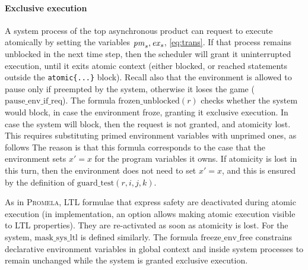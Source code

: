 \documentclass[copyright]{eptcs}
\begin{document}
\paragraph{Exclusive execution}

A system process of the top asynchronous product can request to execute atomically by setting the variables $\mathit{pm}_s, \mathit{ex}_s$, \cref{eq:trans}.
If that process remains unblocked in the next time step, then the scheduler will grant it uninterrupted execution, until it exits atomic context (either blocked, or reached statements outside the \texttt{atomic\{...\}} block).
Recall also that the environment is allowed to pause only if preempted by the system, otherwise it loses the game ($\mathrm{pause\_env\_if\_req}$).
The formula $\mathrm{frozen\_unblocked}(r)$ checks whether the system would block, in case the environment froze, granting it exclusive execution.
In case the system will block, then the request is not granted, and atomicity lost.
This requires substituting primed environment variables with unprimed ones, as follows
The reason is that this formula corresponds to the case that the environment sets $x' = x$ for the program variables it owns.
If atomicity is lost in this turn, then the environment does not need to set $x' = x$, and this is ensured by the definition of $\mathrm{guard\_test}(r, i, j, k)$.

As in \textsc{Promela}, LTL formulae that express safety are deactivated during atomic execution (in implementation, an option allows making atomic execution visible to LTL properties).
They are re-activated as soon as atomicity is lost.
For the system, $\mathrm{mask\_sys\_ltl}$ is defined similarly.
The formula $\mathrm{freeze\_env\_free}$ constrains declarative environment variables in global context and inside system processes to remain unchanged while the system is granted exclusive execution.
\end{document}
